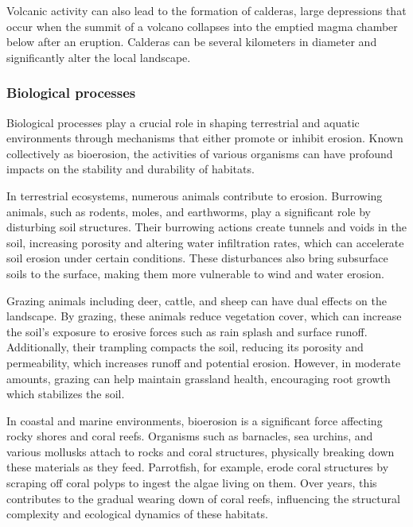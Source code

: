 Volcanic activity can also lead to the formation of calderas, large depressions that occur when the summit of a volcano collapses into the emptied magma chamber below after an eruption. Calderas can be several kilometers in diameter and significantly alter the local landscape. 

\cite{Pretorius2024}


\subsubsection{Biological processes}
Biological processes play a crucial role in shaping terrestrial and aquatic environments through mechanisms that either promote or inhibit erosion. Known collectively as bioerosion, the activities of various organisms can have profound impacts on the stability and durability of habitats.

In terrestrial ecosystems, numerous animals contribute to erosion. Burrowing animals, such as rodents, moles, and earthworms, play a significant role by disturbing soil structures. Their burrowing actions create tunnels and voids in the soil, increasing porosity and altering water infiltration rates, which can accelerate soil erosion under certain conditions. These disturbances also bring subsurface soils to the surface, making them more vulnerable to wind and water erosion.

Grazing animals including deer, cattle, and sheep can have dual effects on the landscape. By grazing, these animals reduce vegetation cover, which can increase the soil's exposure to erosive forces such as rain splash and surface runoff. Additionally, their trampling compacts the soil, reducing its porosity and permeability, which increases runoff and potential erosion. However, in moderate amounts, grazing can help maintain grassland health, encouraging root growth which stabilizes the soil.

In coastal and marine environments, bioerosion is a significant force affecting rocky shores and coral reefs. Organisms such as barnacles, sea urchins, and various mollusks attach to rocks and coral structures, physically breaking down these materials as they feed. Parrotfish, for example, erode coral structures by scraping off coral polyps to ingest the algae living on them. Over years, this contributes to the gradual wearing down of coral reefs, influencing the structural complexity and ecological dynamics of these habitats.

\cite{Jaiswal2019}

